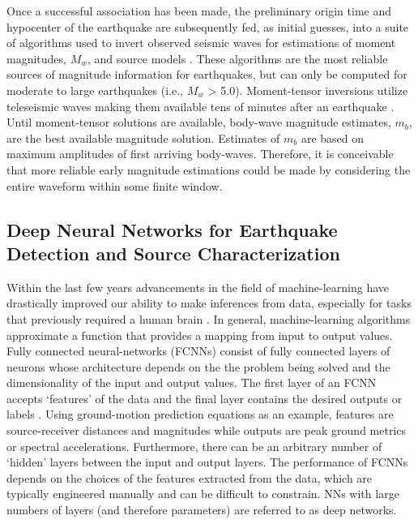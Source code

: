 \documentclass[12p]{article}
\begin{document}
Once a successful association has been made, the preliminary origin time and hypocenter of the earthquake are
subsequently fed, as initial guesses, into a suite of algorithms used to invert observed seismic waves for estimations
of moment magnitudes, $M_w$, and source models \citep{Kanamori2008, Hayes2009, Duputel2012, Ekstrom2012, Melgar2015,
Hayes2017}. These algorithms are the most reliable sources of magnitude information for earthquakes, but can only be
computed for moderate to large earthquakes (i.e., $M_w$ > 5.0). Moment-tensor inversions utilize teleseismic waves
making them available tens of minutes after an earthquake \citep{Hayes2009, Ekstrom2012}. Until moment-tensor solutions
are available, body-wave magnitude estimates, $m_b$, are the best available magnitude solution. Estimates of $m_b$ are
based on maximum amplitudes of first arriving body-waves. Therefore, it is conceivable that more reliable early
magnitude estimations could be made by considering the entire waveform within some finite window.

\subsection{Deep Neural Networks for Earthquake Detection and Source Characterization}

Within the last few years advancements in the field of machine-learning have drastically improved our ability to make
inferences from data, especially for tasks that previously required a human brain \citep{Lecun2015}. In general,
machine-learning algorithms approximate a function that provides a mapping from input to output values. Fully connected
neural-networks (FCNNs) consist of fully connected layers of neurons whose architecture depends on the the problem being
solved and the dimensionality of the input and output values. The first layer of an FCNN accepts `features' of the data
and the final layer contains the desired outputs or labels \citep{Rojas1996}. Using ground-motion prediction equations
as an example, features are source-receiver distances and magnitudes while outputs are peak ground metrics or spectral
accelerations. Furthermore, there can be an arbitrary number of `hidden' layers between the input and output layers. The
performance of FCNNs depends on the choices of the features extracted from the data, which are typically engineered
manually and can be difficult to constrain. NNs with large numbers of layers (and therefore parameters) are referred to
as deep networks.
\end{document}
